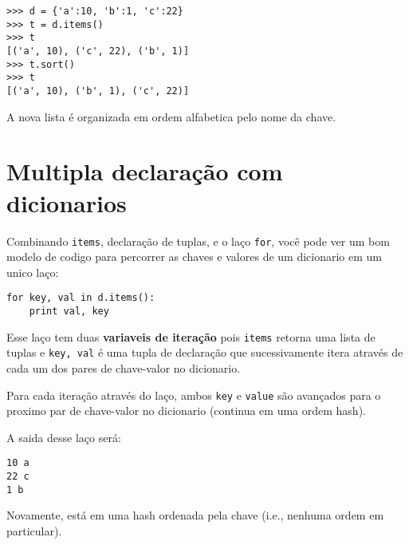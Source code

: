 \beforeverb
\begin{verbatim}
>>> d = {'a':10, 'b':1, 'c':22}
>>> t = d.items()
>>> t
[('a', 10), ('c', 22), ('b', 1)]
>>> t.sort()
>>> t
[('a', 10), ('b', 1), ('c', 22)]
\end{verbatim}
\afterverb
%
A nova lista é organizada em ordem alfabetica pelo nome da chave.

\section{Multipla declaração com dicionarios}


Combinando {\tt items}, declaração de tuplas, e o laço {\tt for}, você
pode ver um bom modelo de codigo para percorrer as chaves e valores de um
dicionario em um unico laço:

\beforeverb
\begin{verbatim}
for key, val in d.items():
    print val, key
\end{verbatim}
\afterverb
%
Esse laço tem duas {\bf variaveis de iteração} pois {\tt items} retorna
uma lista de tuplas e {\tt key, val} é uma tupla de declaração
que sucessivamente itera através de cada um dos pares de chave-valor no
dicionario.

Para cada iteração
através do laço, ambos {\tt key} e {\tt value} são avançados para o
proximo par de chave-valor no dicionario (continua em uma ordem hash).

A saida desse laço será:

\beforeverb
\begin{verbatim}
10 a
22 c
1 b
\end{verbatim}
\afterverb
%
Novamente, está em uma hash ordenada pela chave (i.e., nenhuma ordem em particular).

